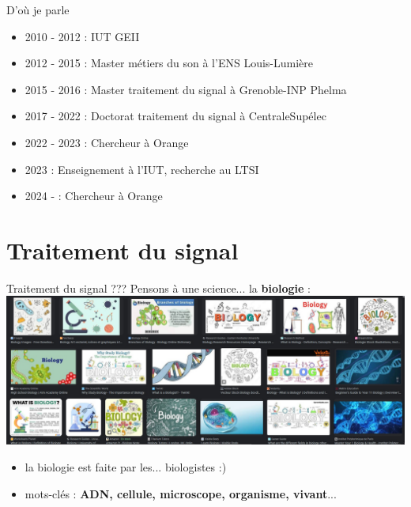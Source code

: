 \documentclass[9pt, aspectratio=169]{beamer}
\begin{document}
\begin{frame}{D'où je parle} %
\begin{center}

    \begin{itemize}
        \item 2010 - 2012 : IUT GEII
        \item 2012 - 2015 : Master métiers du son à l'ENS Louis-Lumière
        \item 2015 - 2016 : Master traitement du signal à Grenoble-INP Phelma
        \item 2017 - 2022 : Doctorat traitement du signal à CentraleSupélec
        \item 2022 - 2023 : Chercheur à Orange
        \item 		 2023 : Enseignement à l'IUT, recherche au LTSI
        \item 2024 -      : Chercheur à Orange
    \end{itemize}
\end{center}
\end{frame}


\section{Traitement du signal}

\begin{frame}{} %
\begin{center}
\Huge \insertsection
\end{center}
\end{frame}

\begin{frame}{\og Traitement du signal \fg{} ???} %
Pensons à une science... \pause la \textbf{biologie} :
\pause
\includegraphics[width=\textwidth]{fig/search_results_biology.jpg}
\pause
\begin{itemize}
    \item la biologie est faite par les... biologistes :)
    \item mots-clés : \textbf{ADN, cellule, microscope, organisme, vivant}...
\end{itemize}

\end{frame}
\end{document}
